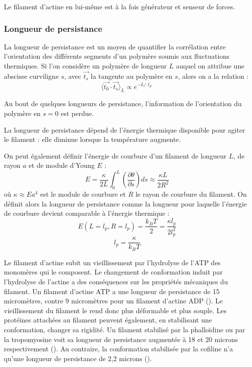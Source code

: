 Le filament d'actine en lui-même est à la fois générateur et senseur de forces. 

 \subsubsection{Longueur de persistance}
La longueur de persistance est un moyen de quantifier la corrélation entre l'orientation des différents segments d'un polymère soumis aux fluctuations thermiques. Si l'on considère un polymère de longueur $L$ auquel on attribue une abscisse curviligne $s$, avec $\vec{t_s}$ la tangente au polymère en $s$, alors on a la relation : 
$$ \langle \vec{t_0}\cdot \vec{t_s} \rangle_L \propto e^{-L/\ell_p}$$

Au bout de quelques longueurs de persistance, l'information de l'orientation du polymère en $s=0$ est perdue. 

La longueur de persistance dépend de l'énergie thermique disponible pour agiter le filament : elle diminue lorsque la température augmente. 

On peut également définir l'énergie de courbure d'un filament de longueur $L$, de rayon $a$ et de module d'Young $E$ : 
$$ E= \frac{\kappa}{2L} \int_0^L \left( \frac{\partial \theta}{\partial s} \right) ds \approx \frac{\kappa L}{2R^2}$$
 où $\kappa \approx Ea^4$ est le module de courbure et $R$ le rayon de courbure du filament.  
 On définit alors la longueur de persistance comme la longueur pour laquelle l'énergie de courbure devient comparable à l'énergie thermique : 
 $$ E (L=l_p,R=l_p) = \frac{k_B T}{2} = \frac{\kappa l_p}{2 l_p^2}$$ 
 $$ l_p = \frac{\kappa}{k_B T}$$
 
 


Le filament d'actine subit un vieillissement par l'hydrolyse de l'ATP des monomères qui le composent. Le changement de conformation induit par l'hydrolyse de l'actine a des conséquences sur les propriétés mécaniques du filament. 
Un filament d'actine ATP a une longueur de persistance de 15 micromètres, contre 9 micromètres pour un filament d'actine ADP (\cite{isambert_flexibility_1995}). Le vieillissement du filament le rend donc plus déformable et plus souple. 
Les protéines attachées au filament peuvent également, en stabilisant une conformation, changer sa rigidité. Un filament stabilisé par la phalloïdine ou par la tropomyosine voit sa longueur de persistance augmentée à 18 et 20 microns respectivement (\cite{isambert_flexibility_1995}). Au contraire, la conformation stabilisée par la cofiline n'a qu'une longueur de persistance de 2,2 microns (\cite{mccullough_cofilin_2008}). 

